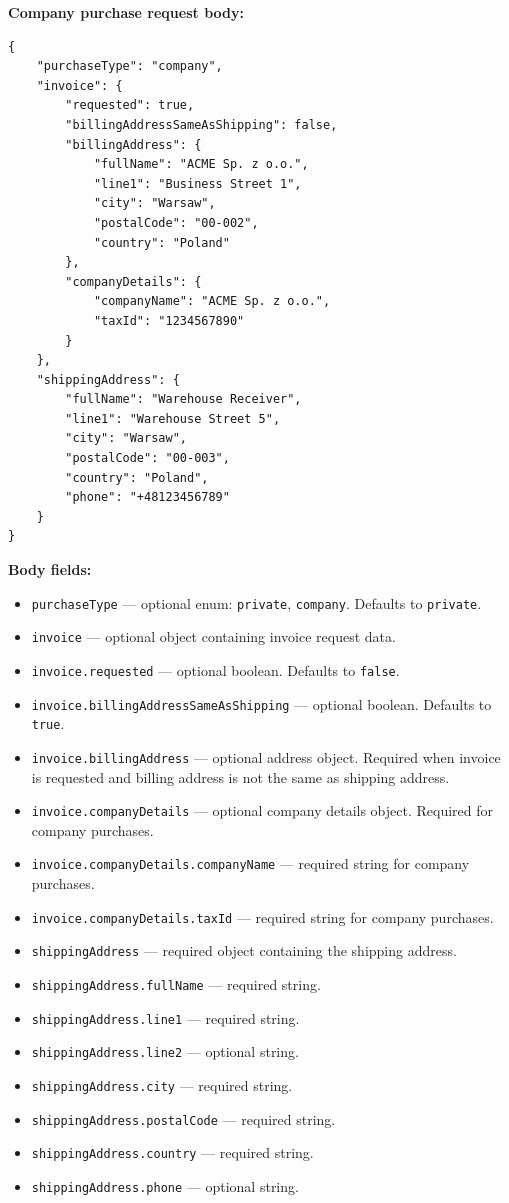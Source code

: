 \pagebreak
\textbf{Company purchase request body:}

\begin{verbatim}
{
    "purchaseType": "company",
    "invoice": {
        "requested": true,
        "billingAddressSameAsShipping": false,
        "billingAddress": {
            "fullName": "ACME Sp. z o.o.",
            "line1": "Business Street 1",
            "city": "Warsaw",
            "postalCode": "00-002",
            "country": "Poland"
        },
        "companyDetails": {
            "companyName": "ACME Sp. z o.o.",
            "taxId": "1234567890"
        }
    },
    "shippingAddress": {
        "fullName": "Warehouse Receiver",
        "line1": "Warehouse Street 5",
        "city": "Warsaw",
        "postalCode": "00-003",
        "country": "Poland",
        "phone": "+48123456789"
    }
}
\end{verbatim}

\textbf{Body fields:}

\begin{itemize}
    \item \texttt{purchaseType} --- optional enum: \texttt{private}, \texttt{company}. Defaults to \texttt{private}.
    \item \texttt{invoice} --- optional object containing invoice request data.
    \item \texttt{invoice.requested} --- optional boolean. Defaults to \texttt{false}.
    \item \texttt{invoice.billingAddressSameAsShipping} --- optional boolean. Defaults to \texttt{true}.
    \item \texttt{invoice.billingAddress} --- optional address object. Required when invoice is requested and billing address is not the same as shipping address.
    \item \texttt{invoice.companyDetails} --- optional company details object. Required for company purchases.
    \item \texttt{invoice.companyDetails.companyName} --- required string for company purchases.
    \item \texttt{invoice.companyDetails.taxId} --- required string for company purchases.
    \item \texttt{shippingAddress} --- required object containing the shipping address.
    \item \texttt{shippingAddress.fullName} --- required string.
    \item \texttt{shippingAddress.line1} --- required string.
    \item \texttt{shippingAddress.line2} --- optional string.
    \item \texttt{shippingAddress.city} --- required string.
    \item \texttt{shippingAddress.postalCode} --- required string.
    \item \texttt{shippingAddress.country} --- required string.
    \item \texttt{shippingAddress.phone} --- optional string.
\end{itemize}


